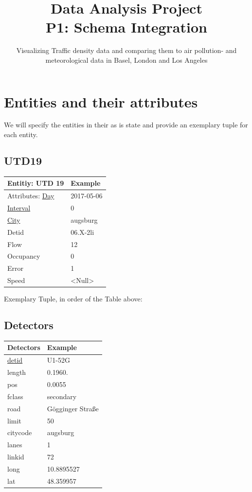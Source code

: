 \documentclass{article}
\title        {Data Analysis Project\\P1: Schema Integration}
\subtitle     {Visualizing Traffic density data and comparing them to air pollution- and meteorological data in Basel, London and Los Angeles}
\begin{document}
\printfront

\section{Entities and their attributes}

We will specify the entities in their as is state and provide an exemplary tuple for each entity.

\subsection{UTD19}

\begin{tabular}{ |p{5cm}| p{5cm}|  }
\hline
 Entitiy: UTD 19 & Example\\
 \hline
Attributes: \uline{Day} & 2017-05-06\\
\uline{Interval}& 0 \\
\uline{City}& augsburg\\
 Detid & 06.X-2li\\
 Flow & 12\\
 Occupancy & 0\\
 Error & 1\\
 Speed & <Null>\\
 \hline
\end{tabular}

Exemplary Tuple, in order of the Table above:




\subsection{Detectors}

\begin{tabular}{ |p{5cm}| p{5cm}| }
\hline
 Detectors & Example\\
 \hline
 \uline{detid} & U1-52G\\
length& 0.1960.\\
 pos & 0.0055\\
 fclass& secondary\\
 road& Gögginger Straße\\
limit& 50\\
 citycode& augsburg\\
  lanes& 1\\
linkid& 72\\
 long& 10.8895527\\
  lat& 48.359957\\
 \hline
\end{tabular}\\
\end{document}
